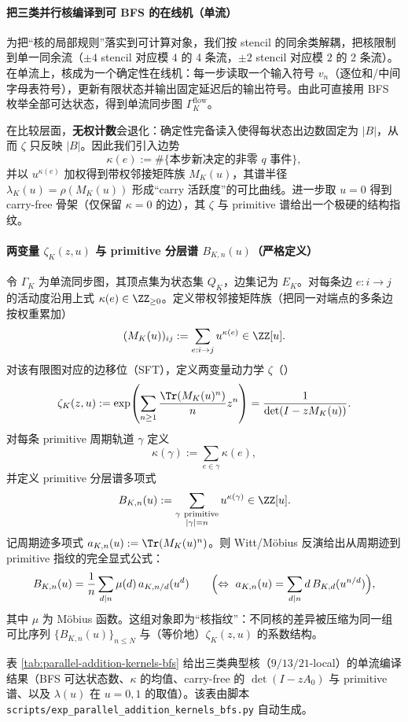 \paragraph{把三类并行核编译到可 BFS 的在线机（单流）}
为把“核的局部规则”落实到可计算对象，我们按 stencil 的同余类解耦，把核限制到单一同余流（$\pm 4$ stencil 对应模 $4$ 的 4 条流，$\pm 2$ stencil 对应模 $2$ 的 2 条流）。在单流上，核成为一个确定性在线机：每一步读取一个输入符号 $v_n$（逐位和/中间字母表符号），更新有限状态并输出固定延迟后的输出符号。由此可直接用 BFS 枚举全部可达状态，得到单流同步图 $\Gamma^{\mathrm{flow}}_K$。

在比较层面，\textbf{无权计数}会退化：确定性完备读入使得每状态出边数固定为 $|B|$，从而 $\zeta$ 只反映 $|B|$。因此我们引入边势
\[
\kappa(e):=\#\{\text{本步新决定的非零 }q\text{ 事件}\},
\]
并以 $u^{\kappa(e)}$ 加权得到带权邻接矩阵族 $M_K(u)$，其谱半径 $\lambda_K(u)=\rho(M_K(u))$ 形成“carry 活跃度”的可比曲线。进一步取 $u=0$ 得到 carry-free 骨架（仅保留 $\kappa=0$ 的边），其 $\zeta$ 与 primitive 谱给出一个极硬的结构指纹。

\paragraph{两变量 \texorpdfstring{$\zeta_K(z,u)$}{zeta(z,u)} 与 primitive 分层谱 \texorpdfstring{$B_{K,n}(u)$}{B\_{K,n}(u)}（严格定义）}
令 $\Gamma_K$ 为单流同步图，其顶点集为状态集 $Q_K$，边集记为 $E_K$。对每条边 $e:i\to j$ 的活动度沿用上式 $\kappa(e)\in\ZZ_{\ge 0}$。定义带权邻接矩阵族（把同一对端点的多条边按权重累加）
\[
(M_K(u))_{ij}:=\sum_{e:i\to j}u^{\kappa(e)}\in\ZZ[u].
\]
对该有限图对应的边移位（SFT），定义两变量动力学 $\zeta$（\cite{BrinStuck2002,ParryPollicott1990Zeta}）
\[
\zeta_K(z,u)
:=\exp\!\left(\sum_{n\ge 1}\frac{\Tr(M_K(u)^n)}{n}z^n\right)
=\frac{1}{\det(I-zM_K(u))}.
\]
对每条 primitive 周期轨道 $\gamma$ 定义
\[
\kappa(\gamma):=\sum_{e\in\gamma}\kappa(e),
\]
并定义 primitive 分层谱多项式
\[
B_{K,n}(u):=\sum_{\substack{\gamma\ \mathrm{primitive}\\ |\gamma|=n}}u^{\kappa(\gamma)}\in\ZZ[u].
\]
记周期迹多项式 $a_{K,n}(u):=\Tr(M_K(u)^n)$。则 Witt/Möbius 反演给出从周期迹到 primitive 指纹的完全显式公式：
\[
B_{K,n}(u)=\frac{1}{n}\sum_{d\mid n}\mu(d)\,a_{K,n/d}(u^d)
\qquad\Bigl(\Leftrightarrow\ a_{K,n}(u)=\sum_{d\mid n} d\,B_{K,d}(u^{n/d})\Bigr),
\]
其中 $\mu$ 为 Möbius 函数。这组对象即为“核指纹”：不同核的差异被压缩为同一组可比序列 $\{B_{K,n}(u)\}_{n\le N}$ 与（等价地）$\zeta_K(z,u)$ 的系数结构。

表 \ref{tab:parallel-addition-kernels-bfs} 给出三类典型核（$9/13/21$-local）的单流编译结果（BFS 可达状态数、$\kappa$ 的均值、carry-free 的 $\det(I-zA_0)$ 与 primitive 谱、以及 $\lambda(u)$ 在 $u=0,1$ 的取值）。该表由脚本 \texttt{scripts/exp\_parallel\_addition\_kernels\_bfs.py} 自动生成。


